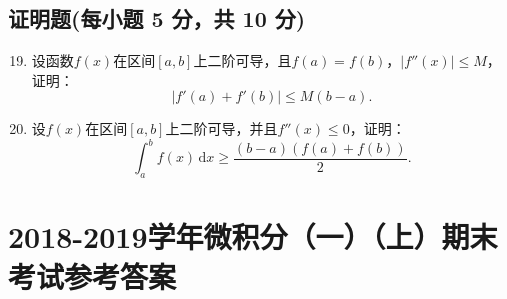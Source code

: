 \documentclass[../Main.tex]{subfiles}
\begin{document}
\section{证明题(每小题 5 分，共 10 分)}
\begin{enumerate}
    \setcounter{enumi}{18}
    \item 设函数$f(x)$在区间$[a,b]$上二阶可导，且$f(a)=f(b)$，$|f''(x)|\leq M$，证明：
          \[
              |f'(a)+f'(b)|\leq M(b-a).
          \]
          \vspace{15em}

    \item 设$f(x)$在区间$[a,b]$上二阶可导，并且$f''(x)\leq 0$，证明：
          \[
              \int_{a}^{b}f(x)\,\mathrm{d}x \geq \frac{(b-a)(f(a)+f(b))}{2}.
          \]
          \vspace{15em}
\end{enumerate}

\chapter{2018-2019学年微积分（一）（上）期末考试参考答案}
\end{document}
